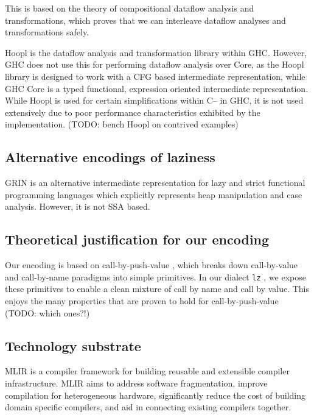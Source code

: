 \documentclass[sigplan,\review anonymous]{acmart}
\newcommand{\lz}{\texttt{lz} }
\begin{document}
This is based on the theory of compositional dataflow analysis
and transformations, \cite{lerner2002composing} 
which proves that we can interleave dataflow analyses and transformations
safely.

Hoopl \cite{ramsey2010hoopl} is the dataflow analysis and transformation library
within GHC. However, GHC does not use this for performing dataflow analysis
over Core, as the Hoopl library is designed to work with a CFG based
intermediate representation, while GHC Core is a typed functional, expression
oriented intermediate representation. While Hoopl is used for certain simplifications
within C-- in GHC, it is not used extensively due to  poor performance characteristics
exhibited by the implementation. (TODO: bench Hoopl on contrived examples)

\subsection{Alternative encodings of laziness}

GRIN  \cite{boquist1996grin} is an alternative intermediate representation
for lazy and strict functional programming languages which explicitly represents
heap manipulation and case analysis. However, it is not SSA based.

\subsection{Theoretical justification for our encoding}

Our encoding is based on call-by-push-value \cite{levy2012call}, which
breaks down call-by-value and call-by-name paradigms into simple primitives. In
our dialect \lz, we expose these primitives to enable a clean mixture of
call by name and call by value. This enjoys the many properties that
are proven to hold for call-by-push-value (TODO: which ones?!)


\subsection{Technology substrate}
                                                         
MLIR \cite{lattner2020mlir} is a compiler framework for building reusable and
extensible compiler infrastructure.  MLIR aims to address software
fragmentation, improve compilation for heterogeneous hardware, significantly
reduce the cost of building domain specific compilers, and aid in connecting
existing compilers together.
\end{document}
